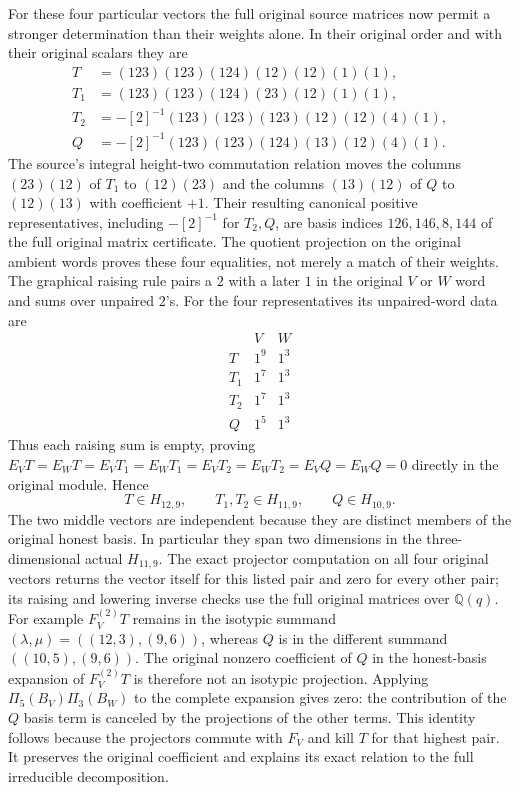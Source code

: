 For these four particular vectors the full original source matrices
now permit a stronger determination than their weights alone.
In their original order and with their original scalars they are
\begin{align*}
 T&=(123)(123)(124)(12)(12)(1)(1),\\
 T_1&=(123)(123)(124)(23)(12)(1)(1),\\
 T_2&=-[2]^{-1}(123)(123)(123)(12)(12)(4)(1),\\
 Q&=-[2]^{-1}(123)(123)(124)(13)(12)(4)(1).
\end{align*}
The source's integral height-two commutation relation moves
the columns $(23)(12)$ of $T_1$ to $(12)(23)$ and
the columns $(13)(12)$ of $Q$ to $(12)(13)$ with coefficient
$+1$. Their resulting canonical positive representatives,
including $-[2]^{-1}$ for $T_2,Q$, are basis indices
$126,146,8,144$ of the full original matrix certificate.
The quotient projection on the original ambient words proves
these four equalities, not merely a match of their weights.
The graphical raising rule pairs a $2$ with a later $1$ in
the original $V$ or $W$ word and sums over unpaired $2$'s.
For the four representatives its unpaired-word data are
\[
\begin{array}{c|cc}
 &V&W\\\hline
T&1^9&1^3\\T_1&1^7&1^3\\T_2&1^7&1^3\\Q&1^5&1^3
\end{array}
\]
Thus each raising sum is empty, proving
$E_VT=E_WT=E_VT_1=E_WT_1=E_VT_2=E_WT_2=E_VQ=E_WQ=0$
directly in the original module. Hence
\[
 T\in H_{12,9},\qquad T_1,T_2\in H_{11,9},\qquad
 Q\in H_{10,9}.
\]
The two middle vectors are independent because they are distinct
members of the original honest basis. In particular they span
two dimensions in the three-dimensional actual $H_{11,9}$.
The exact projector computation on all four original vectors
returns the vector itself for this listed pair and zero for
every other pair; its raising and lowering inverse checks use
the full original matrices over $\mathbb Q(q)$.
For example $F_V^{(2)}T$ remains in the isotypic summand
$(\lambda,\mu)=((12,3),(9,6))$, whereas $Q$ is in the different
summand $((10,5),(9,6))$. The original nonzero coefficient of
$Q$ in the honest-basis expansion of $F_V^{(2)}T$ is therefore
not an isotypic projection. Applying $\Pi_5(B_V)\Pi_3(B_W)$
to the complete expansion gives zero: the contribution of the
$Q$ basis term is canceled by the projections of the other
terms. This identity follows because the projectors commute
with $F_V$ and kill $T$ for that highest pair. It preserves
the original coefficient and explains its exact relation to
the full irreducible decomposition.
